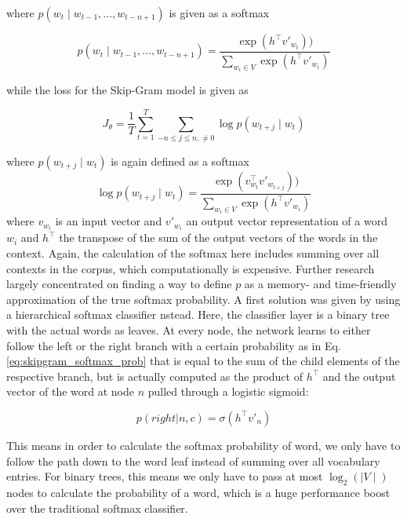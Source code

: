 \documentclass[11pt]{article}
\begin{document}
where $p(w_{t}\mid w_{t-1},\dots,w_{t-n+1})$ is given as a softmax

\begin{equation}
p(w_{t}\mid w_{t-1},\dots,w_{t-n+1}) = \frac{\exp(h^\top v'_{w_{t}}))}{\sum_{w_i \in V} \exp(h^\top v'_{w_i})} 
\label{eq:cbow_softmax_prob}
\end{equation}

while the loss for the Skip-Gram model is given as

\begin{equation}
J_{\theta} = \frac{1}{T} \sum_{t=1}^{T}\sum_{-n\leq j\leq n,\neq 0}\log p(w_{t+j}\mid w_{t})
\label{eq:skipgram_loss}
\end{equation}

where $p(w_{t+j}\mid w_{t})$ is again defined as a softmax
\begin{equation}
\log p(w_{t+j}\mid w_{t}) = \frac{\exp(v_{w_{t}}^\top v'_{w_{t+j}}))}{\sum_{w_i \in V} \exp(h^\top v'_{w_i})}
\label{eq:skipgram_softmax_prob}
\end{equation}
where $v_w_i$ is an input vector and $v'_w_i$ an output vector representation of a word $w_i$ and $h^\top$ the transpose of the sum of the output vectors of the words in the context. Again, the calculation of the softmax here includes summing over all contexts in the corpus, which computationally is expensive. Further research largely concentrated on finding a way to define $p$ as a memory- and time-friendly approximation of the true softmax probability. A first solution was given by using a hierarchical softmax classifier \cite{morin2005hierarchical} nstead. Here, the classifier layer is a binary tree with the actual words as leaves. At every node, the network learns to either follow the left or the right branch with a certain probability as in Eq. \ref{eq:skipgram_softmax_prob} that is equal to the sum of the child elements of the respective  branch, but is actually computed as the product of $h^\top$ and the output vector of the word at node $n$ pulled through a logistic sigmoid:

\begin{equation}
p(right|n,c) = \sigma(h^\top v'_n) 
\label{eq:hierarchicalsoftmax_nodeprob}
\end{equation}

This means  in order to calculate the softmax probability of word, we only have to follow the path down to the word leaf instead of summing over all vocabulary entries. For binary trees, this means we only have to pass at most $\log_2(\mid V\mid)$ nodes to calculate the probability of a word, which is a huge performance boost over the traditional softmax classifier. 
\end{document}
